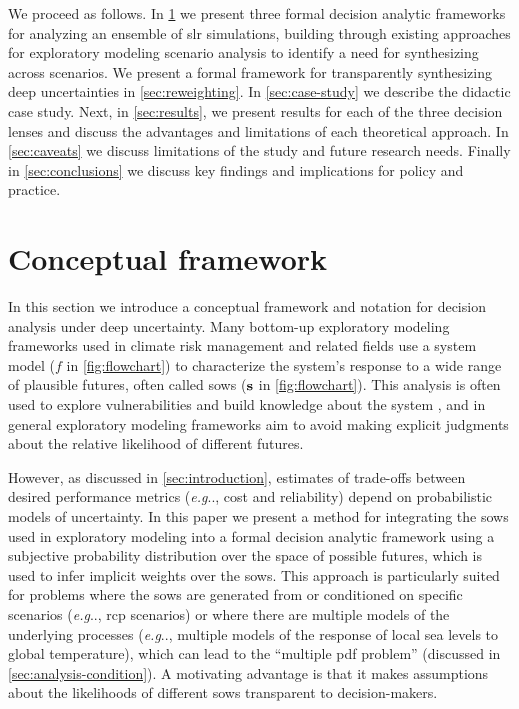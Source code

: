 \documentclass{agujournal2019}
\makeatletter
\DeclareRobustCommand\onedot{\futurelet\@let@token\@onedot}
\def\@onedot{\ifx\@let@token.\else.\null\fi\xspace}
\def\eg{\emph{e.g}\onedot} \def\Eg{\emph{E.g}\onedot}
\makeatother
\begin{document}
We proceed as follows.
In \cref{sec:analysis} we present three formal decision analytic frameworks for analyzing an ensemble of \gls{slr} simulations, building through existing approaches for exploratory modeling scenario analysis to identify a need for synthesizing across scenarios.
We present a formal framework for transparently synthesizing deep uncertainties in \cref{sec:reweighting}.
In \cref{sec:case-study} we describe the didactic case study.
Next, in \cref{sec:results}, we present results for each of the three decision lenses and discuss the advantages and limitations of each theoretical approach.
In \cref{sec:caveats} we discuss limitations of the study and future research needs.
Finally in \cref{sec:conclusions} we discuss key findings and implications for policy and practice.

\section{Conceptual framework}\label{sec:analysis}

In this section we introduce a conceptual framework and notation for decision analysis under deep uncertainty.
Many bottom-up exploratory modeling frameworks used in climate risk management and related fields use a system model ($f$ in \cref{fig:flowchart})  to characterize the system's response to a wide range of plausible futures, often called \glspl{sow} ($\vb{s}$ in \cref{fig:flowchart}).
This analysis is often used to explore vulnerabilities and build knowledge about the system \cite{bankes:1993}, and in general exploratory modeling frameworks aim to avoid making explicit judgments about the relative likelihood of different futures.

However, as discussed in \cref{sec:introduction}, estimates of trade-offs between desired performance metrics (\eg, cost and reliability) depend on probabilistic models of uncertainty.
In this paper we present a method for integrating the \glspl{sow} used in exploratory modeling into a formal decision analytic framework using a subjective probability distribution over the space of possible futures, which is used to infer implicit weights over the \glspl{sow}.
This approach is particularly suited for problems where the \glspl{sow} are generated from or conditioned on specific scenarios (\eg, \gls{rcp} scenarios) or where there are multiple models of the underlying processes (\eg, multiple models of the response of local sea levels to global temperature), which can lead to the ``multiple \gls{pdf} problem'' (discussed in \cref{sec:analysis-condition}).
A motivating advantage is that it makes assumptions about the likelihoods of different \glspl{sow} transparent to decision-makers.
\end{document}
